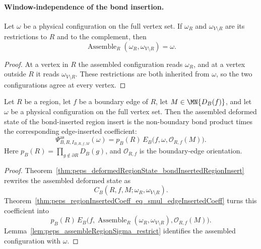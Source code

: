 \paragraph{Window-independence of the bond insertion.}

\begin{lemma}
    \label{lem:peps_assembleRegionSigma_restrict}
    \leanok
    Let $\omega$ be a physical configuration on the full vertex set.  If
    $\omega_R$ and $\omega_{V\setminus R}$ are its restrictions to $R$ and
    to the complement, then
    \[
        \operatorname{Assemble}_R(\omega_R,\omega_{V\setminus R})=\omega.
    \]
\end{lemma}
\begin{proof}
    \leanok
    At a vertex in $R$ the assembled configuration reads $\omega_R$, and at a
    vertex outside $R$ it reads $\omega_{V\setminus R}$.  These restrictions
    are both inherited from $\omega$, so the two configurations agree at every
    vertex.
\end{proof}

\begin{theorem}
    \label{thm:peps_deformedRegionStateAssembled_bondInserted_eq_smul_edgeInsertedCoeff}
    \leanok
    Let $R$ be a region, let $f$ be a boundary edge of $R$, let
    $M\in\MN{D_B(f)}$, and let $\omega$ be a physical configuration on the
    full vertex set.  Then the assembled deformed state of the bond-inserted
    region insert is the non-boundary bond product times the corresponding
    edge-inserted coefficient:
    \[
        \Psi^{\mathrm{as}}_{B,R,I_{B,R,f,M}}(\omega)
        =
        p_B(R)\,
        E_B\bigl(f,\omega,\mathcal O_{R,f}(M)\bigr).
    \]
    Here $p_B(R)=\prod_{g\notin\partial R}D_B(g)$, and $\mathcal O_{R,f}$ is
    the boundary-edge orientation.
\end{theorem}
\begin{proof}
    \leanok
    Theorem~\ref{thm:peps_deformedRegionState_bondInsertedRegionInsert}
    rewrites the assembled deformed state as
    \[
        C_B(R,f,M;\omega_R,\omega_{V\setminus R}).
    \]
    Theorem~\ref{thm:peps_regionInsertedCoeff_eq_smul_edgeInsertedCoeff}
    turns this coefficient into
    \[
        p_B(R)\,
        E_B\bigl(f,\operatorname{Assemble}_R
            (\omega_R,\omega_{V\setminus R}),\mathcal O_{R,f}(M)\bigr).
    \]
    Lemma~\ref{lem:peps_assembleRegionSigma_restrict} identifies the assembled
    configuration with $\omega$.
\end{proof}

